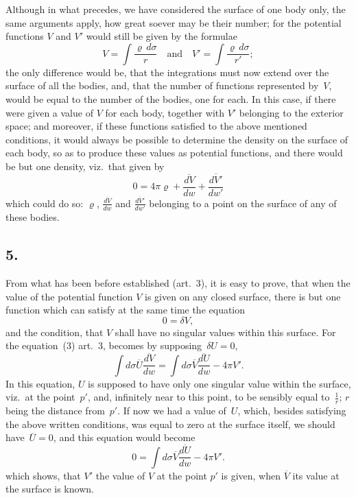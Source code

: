 \documentclass[12pt,notitlepage]{amsart}
\newcommand\Section[1]{\subsection{{#1}}}
\renewcommand{\rho}{\varrho}
\begin{document}
Although in what precedes, we have considered the surface of one
body only, the same arguments apply, how great soever may be their number;
for the potential functions $V$ and $V'$ would still be given by the formulae
\[
V=\int\frac{\rho\,d\sigma}{r}
\quad\text{and}\quad
V'=\int\frac{\rho\,d\sigma}{r'};
\]
the only difference would be, that the integrations must now extend over the
surface of all the bodies, and, that the number of functions
represented by~$V$,
would be equal to the number of the bodies, one for each. In this case, if
there were given a value of $V$ for each body,
together with $V'$ belonging
to the exterior space; and moreover, if these functions satisfied to the above
mentioned conditions, it would always be possible to determine the density
on the surface of each body, so as to produce these values as potential
functions, and there would be but one density, viz.\ that given by
\[
\tag{4'.}
0=4\pi\rho+\frac{\overline{dV}}{dw}+\frac{\overline{dV'}}{dw'}
\]
which could do so:
$\rho$, $\frac{\overline{dV}}{dw}$ and $\frac{\overline{dV'}}{dw'}$
belonging to a point on the surface of
any of these bodies.
\bigskip

\Section{5.}
From what has been before established (art.~3), it is easy to prove,
that when the value of the potential function $V$ is given on any closed 
surface, there is but one function
which can satisfy at the same time the equation
\[
0=\delta V,
\]
and the condition, that $V$ shall have no singular values within this surface.
For the equation~(3) art.~3, becomes by supposing~$\delta U=0$,
\[
\int d\sigma\overline{U}\frac{\overline{dV}}{dw}
=\int d\sigma\overline{V}\frac{\overline{dU}}{dw}-4\pi V'.
\]
In this equation, $U$ is supposed to have only one singular value within the
surface, viz.\ at the point~$p'$, and,
infinitely near to this point, to be sensibly
equal to~$\frac1r$; $r$ being the distance from~$p'$.
If now we had a value of~$U$,
which, besides satisfying the above written conditions, was equal to zero at
the surface itself, we should have~$\overline{U}=0$,
and this equation would become
\[
\tag{5.}
0=\int d\sigma\overline{V}\frac{\overline{dU}}{dw}-4\pi V'.
\]
which shows, that $V'$ the value of $V$ at the point $p'$ is given,
when $\overline{V}$ its
value at the surface is known.
\end{document}
